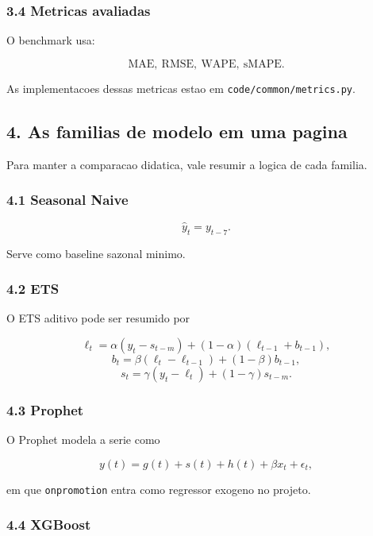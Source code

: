 \documentclass[12pt]{article}
\begin{document}
\subsubsection{3.4 Metricas avaliadas}\label{34-metricas-avaliadas}

O benchmark usa:

\[
\mathrm{MAE},\ \mathrm{RMSE},\ \mathrm{WAPE},\ \mathrm{sMAPE}.
\]

As implementacoes dessas metricas estao em \texttt{code/common/metrics.py}.

\subsection{4. As familias de modelo em uma pagina}\label{4-as-familias-de-modelo-em-uma-pagina}

Para manter a comparacao didatica, vale resumir a logica de cada familia.

\subsubsection{4.1 Seasonal Naive}\label{41-seasonal-naive}

\[
\hat{y}_t = y_{t-7}.
\]

Serve como baseline sazonal minimo.

\subsubsection{4.2 ETS}\label{42-ets}

O ETS aditivo pode ser resumido por

\[
\ell_t = \alpha (y_t - s_{t-m}) + (1 - \alpha)(\ell_{t-1} + b_{t-1}),
\]
\[
b_t = \beta (\ell_t - \ell_{t-1}) + (1 - \beta) b_{t-1},
\]
\[
s_t = \gamma (y_t - \ell_t) + (1 - \gamma) s_{t-m}.
\]

\subsubsection{4.3 Prophet}\label{43-prophet}

O Prophet modela a serie como

\[
y(t) = g(t) + s(t) + h(t) + \beta x_t + \epsilon_t,
\]

em que \texttt{onpromotion} entra como regressor exogeno no projeto.

\subsubsection{4.4 XGBoost}\label{44-xgboost}
\end{document}
